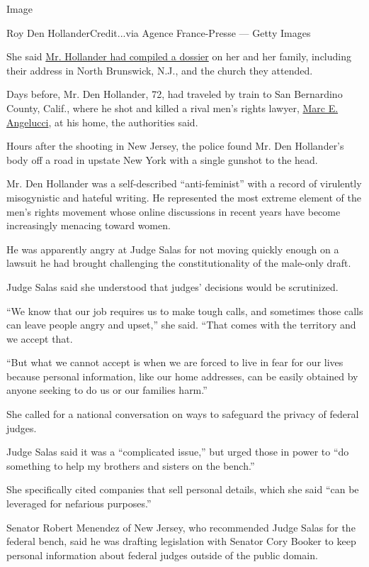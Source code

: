Image

Roy Den HollanderCredit...via Agence France-Presse --- Getty Images

She said
\href{https://www.nytimes.com/2020/07/26/nyregion/roy-den-hollander-judge.html}{Mr.
Hollander had compiled a dossier} on her and her family, including their
address in North Brunswick, N.J., and the church they attended.

Days before, Mr. Den Hollander, 72, had traveled by train to San
Bernardino County, Calif., where he shot and killed a rival men's rights
lawyer,
\href{https://www.nytimes.com/2020/07/22/nyregion/roy-den-hollander-esther-salas.html}{Marc
E. Angelucci}, at his home, the authorities said.

Hours after the shooting in New Jersey, the police found Mr. Den
Hollander's body off a road in upstate New York with a single gunshot to
the head.

Mr. Den Hollander was a self-described ``anti-feminist'' with a record
of virulently misogynistic and hateful writing. He represented the most
extreme element of the men's rights movement whose online discussions in
recent years have become increasingly menacing toward women.

He was apparently angry at Judge Salas for not moving quickly enough on
a lawsuit he had brought challenging the constitutionality of the
male-only draft.

Judge Salas said she understood that judges' decisions would be
scrutinized.

``We know that our job requires us to make tough calls, and sometimes
those calls can leave people angry and upset,'' she said. ``That comes
with the territory and we accept that.

``But what we cannot accept is when we are forced to live in fear for
our lives because personal information, like our home addresses, can be
easily obtained by anyone seeking to do us or our families harm.''

She called for a national conversation on ways to safeguard the privacy
of federal judges.

Judge Salas said it was a ``complicated issue,'' but urged those in
power to ``do something to help my brothers and sisters on the bench.''

She specifically cited companies that sell personal details, which she
said ``can be leveraged for nefarious purposes.''

Senator Robert Menendez of New Jersey, who recommended Judge Salas for
the federal bench, said he was drafting legislation with Senator Cory
Booker to keep personal information about federal judges outside of the
public domain.

